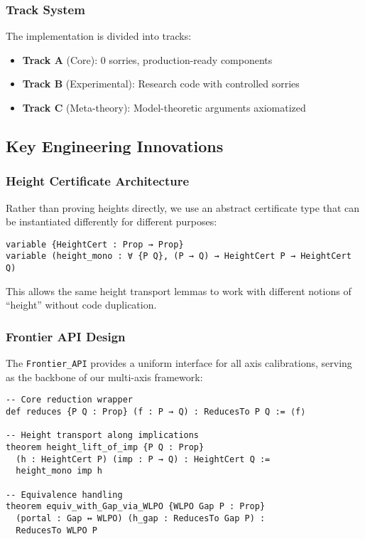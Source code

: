 \documentclass[11pt]{article}
\theoremstyle{plain}
\theoremstyle{definition}
\begin{document}
\subsubsection{Track System}

The implementation is divided into tracks:
\begin{itemize}
\item \textbf{Track A} (Core): 0 sorries, production-ready components
\item \textbf{Track B} (Experimental): Research code with controlled sorries
\item \textbf{Track C} (Meta-theory): Model-theoretic arguments axiomatized
\end{itemize}

\subsection{Key Engineering Innovations}

\subsubsection{Height Certificate Architecture}

Rather than proving heights directly, we use an abstract certificate type that can be instantiated differently for different purposes:

\begin{verbatim}
variable {HeightCert : Prop → Prop}
variable (height_mono : ∀ {P Q}, (P → Q) → HeightCert P → HeightCert Q)
\end{verbatim}

This allows the same height transport lemmas to work with different notions of ``height'' without code duplication.

\subsubsection{Frontier API Design}

The \texttt{Frontier\_API} provides a uniform interface for all axis calibrations, serving as the backbone of our multi-axis framework:

\begin{verbatim}
-- Core reduction wrapper
def reduces {P Q : Prop} (f : P → Q) : ReducesTo P Q := ⟨f⟩

-- Height transport along implications  
theorem height_lift_of_imp {P Q : Prop} 
  (h : HeightCert P) (imp : P → Q) : HeightCert Q :=
  height_mono imp h

-- Equivalence handling
theorem equiv_with_Gap_via_WLPO {WLPO Gap P : Prop} 
  (portal : Gap ↔ WLPO) (h_gap : ReducesTo Gap P) : 
  ReducesTo WLPO P
\end{verbatim}
\end{document}
